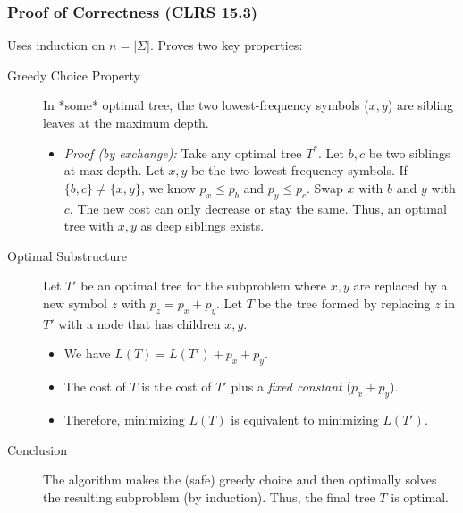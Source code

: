 \subsubsection{Proof of Correctness (CLRS 15.3)}
Uses induction on $n=|\Sigma|$. Proves two key properties:
\begin{description}
    \item[Greedy Choice Property] In *some* optimal tree, the two lowest-frequency symbols ($x, y$) are sibling leaves at the maximum depth.
    \begin{itemize}
        \item \textit{Proof (by exchange):} Take any optimal tree $T^*$. Let $b, c$ be two siblings at max depth. Let $x, y$ be the two lowest-frequency symbols. If $\{b,c\} \neq \{x,y\}$, we know $p_x \le p_b$ and $p_y \le p_c$. Swap $x$ with $b$ and $y$ with $c$. The new cost can only decrease or stay the same. Thus, an optimal tree with $x, y$ as deep siblings exists.
    \end{itemize}
    \item[Optimal Substructure] Let $T'$ be an optimal tree for the subproblem where $x,y$ are replaced by a new symbol $z$ with $p_z = p_x + p_y$. Let $T$ be the tree formed by replacing $z$ in $T'$ with a node that has children $x, y$.
    \begin{itemize}
        \item We have $L(T) = L(T') + p_x + p_y$.
        \item The cost of $T$ is the cost of $T'$ plus a \textit{fixed constant} ($p_x+p_y$).
        \item Therefore, minimizing $L(T)$ is equivalent to minimizing $L(T')$.
    \end{itemize}
    \item[Conclusion] The algorithm makes the (safe) greedy choice and then optimally solves the resulting subproblem (by induction). Thus, the final tree $T$ is optimal.
\end{description}
